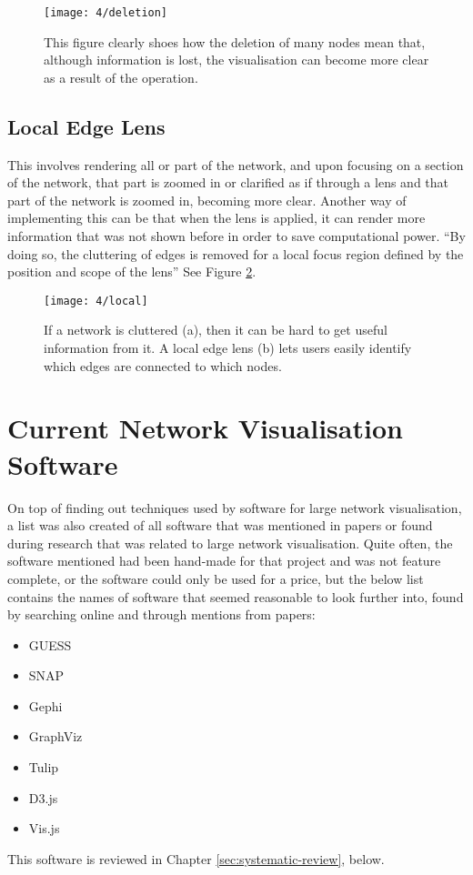 \documentclass[../dissertation.tex]{subfiles}
\begin{document}
\begin{figure}
    \centering
    \texttt{[image: 4/deletion]}
    \caption{This figure clearly shoes how the deletion of many nodes mean that, although information is lost, the visualisation can become more clear as a result of the operation. \cite{hu2015visualizing}}
    \label{fig:deletion}
\end{figure}

\subsection{Local Edge Lens}

This involves rendering all or part of the network, and upon focusing on a section of the network, that part is zoomed in or clarified as if through a lens and that part of the network is zoomed in, becoming more clear. Another way of implementing this can be that when the lens is applied, it can render more information that was not shown before in order to save computational power. ``By doing so, the cluttering of edges is removed for a local focus region defined by the position and scope of the lens'' \cite{tominski2006fisheye} See Figure \ref{fig:local}.
\begin{figure}
    \centering
    \texttt{[image: 4/local]}
    \caption{If a network is cluttered (a), then it can be hard to get useful information from it. A local edge lens (b) lets users easily identify which edges are connected to which nodes. \cite{tominski2006fisheye}}
    \label{fig:local}
\end{figure}

\section{Current Network Visualisation Software}

On top of finding out techniques used by software for large network visualisation, a list was also created of all software that was mentioned in papers or found during research that was related to large network visualisation. Quite often, the software mentioned had been hand-made for that project and was not feature complete, or the software could only be used for a price, but the below list contains the names of software that seemed reasonable to look further into, found by searching online and through mentions from papers:
\begin{itemize}
    \item GUESS \cite{guess}
    \item SNAP \cite{snap}
    \item Gephi \cite{gephi}
    \item GraphViz \cite{graphviz}
    \item Tulip \cite{tulip}
    \item D3.js \cite{d3}
    \item Vis.js \cite{vis}
\end{itemize}

This software is reviewed in Chapter \ref{sec:systematic-review}, below.
\end{document}
